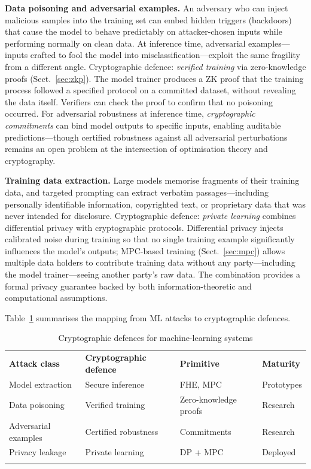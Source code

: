 \textbf{Data poisoning and adversarial examples.}  An adversary who can inject malicious samples into the training set can embed hidden triggers (backdoors) that cause the model to behave predictably on attacker-chosen inputs while performing normally on clean data.  At inference time, adversarial examples---inputs crafted to fool the model into misclassification---exploit the same fragility from a different angle.  Cryptographic defence: \emph{verified training} via zero-knowledge proofs (Sect.~\ref{sec:zkp}).  The model trainer produces a ZK proof that the training process followed a specified protocol on a committed dataset, without revealing the data itself.  Verifiers can check the proof to confirm that no poisoning occurred.  For adversarial robustness at inference time, \emph{cryptographic commitments} can bind model outputs to specific inputs, enabling auditable predictions---though certified robustness against all adversarial perturbations remains an open problem at the intersection of optimisation theory and cryptography.

\textbf{Training data extraction.}  Large models memorise fragments of their training data, and targeted prompting can extract verbatim passages---including personally identifiable information, copyrighted text, or proprietary data that was never intended for disclosure.  Cryptographic defence: \emph{private learning} combines differential privacy with cryptographic protocols.  Differential privacy injects calibrated noise during training so that no single training example significantly influences the model's outputs; MPC-based training (Sect.~\ref{sec:mpc}) allows multiple data holders to contribute training data without any party---including the model trainer---seeing another party's raw data.  The combination provides a formal privacy guarantee backed by both information-theoretic and computational assumptions.

Table~\ref{tab:ml-crypto-defences} summarises the mapping from ML attacks to cryptographic defences.

\begin{table}[t]
\caption{Cryptographic defences for machine-learning systems}
\label{tab:ml-crypto-defences}
\begin{tabular}{p{3cm}p{3.5cm}p{3cm}p{2.5cm}}
\hline\noalign{\smallskip}
\textbf{Attack class} & \textbf{Cryptographic defence} & \textbf{Primitive} & \textbf{Maturity} \\
\noalign{\smallskip}\svhline\noalign{\smallskip}
Model extraction & Secure inference & FHE, MPC & Prototypes \\
Data poisoning & Verified training & Zero-knowledge proofs & Research \\
Adversarial examples & Certified robustness & Commitments & Research \\
Privacy leakage & Private learning & DP + MPC & Deployed \\
\noalign{\smallskip}\hline
\end{tabular}
\end{table}


